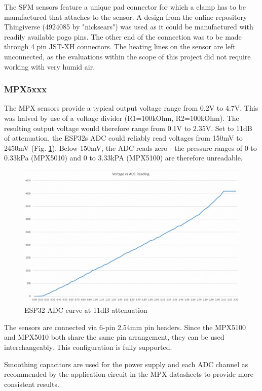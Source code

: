 \documentclass[MME,Projekt,english]{twbook}%
\begin{document}
The SFM sensors feature a unique pad connector for which a clamp has to be manufactured that attaches to the sensor. A design from
the online repository Thingiverse (4924085 by "nicksears") was used as it could be manufactured with readily available pogo pins. The other
end of the connection was to be made through 4 pin JST-XH connectors. The heating lines on the sensor are left unconnected, as the
evaluations within the scope of this project did not require working with very humid air.

\subsubsection{MPX5xxx}

The MPX sensors provide a typical output voltage range from 0.2V to 4.7V. This was halved by use of a voltage divider (R1=100kOhm, R2=100kOhm).
The resulting output voltage would therefore range from 0.1V to 2.35V. Set to 11dB of attenuation, the
ESP32s ADC could reliably read voltages from 150mV to 2450mV (Fig. \ref{esp-adc}). Below 150mV, the ADC reads zero - the pressure ranges of 0 to 0.33kPa (MPX5010)
and 0 to 3.33kPA (MPX5100) are therefore unreadable.

\begin{figure}[!htbp]
	\centering
	\includegraphics[width=.8\linewidth]{images/esp-adc.png}
	\caption{ESP32 ADC curve at 11dB attenuation}\label{esp-adc}
\end{figure}

The sensors are connected via 6-pin 2.54mm pin headers. Since the MPX5100 and MPX5010 both share the same pin arrangement, they can
be used interchangeably. This configuration is fully supported.

Smoothing capacitors are used for the power supply and each ADC channel as recommended by the application circuit in the MPX datasheets
to provide more consistent results.
\end{document}
